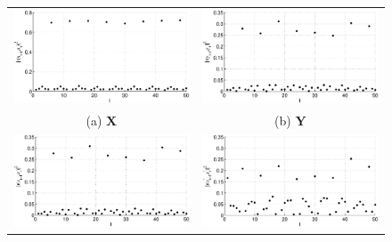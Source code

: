 \begin{figure}[ht]
\begin{tabular}{cc}
\includegraphics[scale=0.48]{NoisyMultiResponseExample_autocorrX.eps} & \includegraphics[scale=0.48]{NoisyMultiResponseExample_autocorrY.eps} \\
(a) $\mathbf{X}$ & (b) $\mathbf{Y}$ \\
\includegraphics[scale=0.48]{NoisyMultiResponseExample_autocorrZ1.eps} & \includegraphics[scale=0.48]{NoisyMultiResponseExample_autocorrZ2.eps} \\

\end{tabular}
\end{figure}
